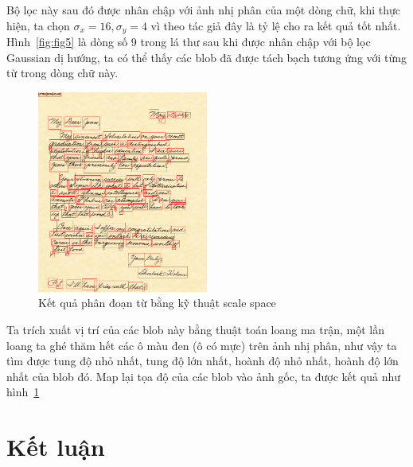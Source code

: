\documentclass[a4paper]{article}
\begin{document}
Bộ lọc này sau đó được nhân chập với ảnh nhị phân của một dòng chữ, khi thực hiện, ta chọn $\sigma_x = 16, \sigma_y = 4$ vì theo tác giả đây là tỷ lệ cho ra kết quả tốt nhất. Hình~\ref{fig:fig5} là dòng số 9 trong lá thư sau khi được nhân chập với bộ lọc Gaussian dị hướng, ta có thể thấy các blob đã được tách bạch tương ứng với từng từ trong dòng chữ này.\par

\begin{figure}
    \centering
    \includegraphics[width=0.5\textwidth]{boxes.png}
    \caption{Kết quả phân đoạn từ bằng kỹ thuật scale space}
    \label{fig:fig6}
\end{figure}


Ta trích xuất vị trí của các blob này bằng thuật toán loang ma trận, một lần loang ta ghé thăm hết các ô màu đen (ô có mực) trên ảnh nhị phân, như vậy ta tìm được tung độ nhỏ nhất, tung độ lớn nhất, hoành độ nhỏ nhất, hoành độ lớn nhất của blob đó. Map lại tọa độ của các blob vào ảnh gốc, ta được kết quả như hình~\ref{fig:fig6}

\pagebreak
\section{Kết luận}
\label{sec:4}
\end{document}
